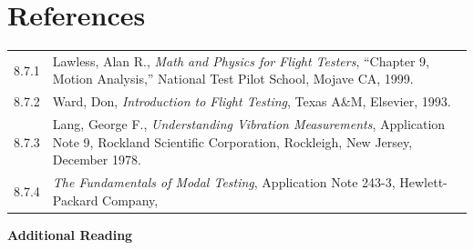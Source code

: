 \documentclass[
]{book}
\begin{document}
\hypertarget{references}{%
\section{References}\label{references}}

\begin{longtable}[]{@{}ll@{}}
\toprule
\endhead
\begin{minipage}[t]{0.06\columnwidth}\raggedright
8.7.1\strut
\end{minipage} & \begin{minipage}[t]{0.88\columnwidth}\raggedright
Lawless, Alan R., \emph{Math and Physics for Flight Testers}, ``Chapter 9, Motion Analysis,'' National Test Pilot School, Mojave CA, 1999.\strut
\end{minipage}\tabularnewline
\begin{minipage}[t]{0.06\columnwidth}\raggedright
8.7.2\strut
\end{minipage} & \begin{minipage}[t]{0.88\columnwidth}\raggedright
Ward, Don, \emph{Introduction to Flight Testing}, Texas A\&M, Elsevier, 1993.\strut
\end{minipage}\tabularnewline
\begin{minipage}[t]{0.06\columnwidth}\raggedright
8.7.3\strut
\end{minipage} & \begin{minipage}[t]{0.88\columnwidth}\raggedright
Lang, George F., \emph{Understanding Vibration Measurements}, Application Note 9, Rockland Scientific Corporation, Rockleigh, New Jersey, December 1978.\strut
\end{minipage}\tabularnewline
\begin{minipage}[t]{0.06\columnwidth}\raggedright
8.7.4\strut
\end{minipage} & \begin{minipage}[t]{0.88\columnwidth}\raggedright
\emph{The Fundamentals of Modal Testing}, Application Note 243-3, Hewlett-Packard Company,\strut
\end{minipage}\tabularnewline
\bottomrule
\end{longtable}

\textbf{Additional Reading}
\end{document}
